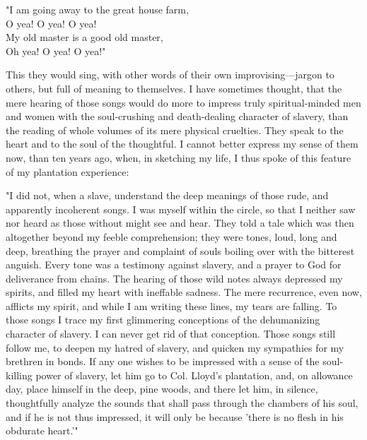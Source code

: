 "I am going away to the great house farm,\\
{﻿}O yea! O yea! O yea!\\
My old master is a good old master,\\
{﻿}Oh yea! O yea! O yea!"

This they would sing, with other words of their own improvising---jargon
to others, but full of meaning to themselves. I have sometimes thought,
that the mere hearing of those songs would do more to impress truly
spiritual-minded men and women with the soul-crushing and death-dealing
character of slavery, than the reading of whole volumes of its mere
physical cruelties. They speak to the heart and to the soul of the
thoughtful. I cannot better express my sense of them now, than ten years
ago, when, in sketching my life, I thus spoke of this feature of my
plantation experience:

{}

"I did not, when a slave, understand the deep meanings of those rude,
and apparently incoherent songs. I was myself within the circle, so that
I neither saw nor heard as those without might see and hear. They told a
tale which was then altogether beyond my feeble comprehension; they were
tones, loud, long and deep, breathing the prayer and complaint of souls
boiling over with the bitterest anguish. Every tone was a testimony
against slavery, and a prayer to God for deliverance from chains. The
hearing of those wild notes always depressed my spirits, and filled my
heart with ineffable sadness. The mere recurrence, even now, afflicts my
spirit, and while I am writing these lines, my tears are falling. To
those songs I trace my first glimmering conceptions of the dehumanizing
character of slavery. I can never get rid of that conception. Those
songs still follow me, to deepen my hatred of slavery, and quicken my
sympathies for my brethren in bonds. If any one wishes to be impressed
with a sense of the soul-killing power of slavery, let him go to Col.
Lloyd's plantation, and, on allowance day, place himself in the deep,
pine woods, and there let him, in silence, thoughtfully analyze the
sounds that shall pass through the chambers of his soul, and if he is
not thus impressed, it will only be because 'there is no flesh in his
obdurate heart.{'}"

~


